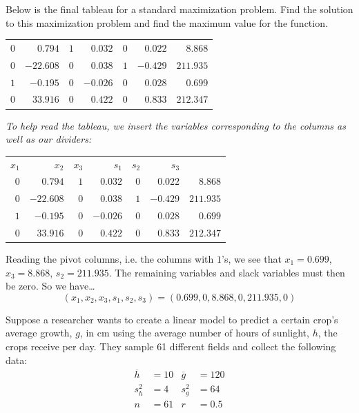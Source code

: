 \documentclass[12pt,letterpaper]{exam}
\begin{document}
\begin{questions}
\newpage
\question[10] Below is the final tableau for a standard maximization problem. Find the solution to this maximization problem and find the maximum value for the function.
	\begin{table}[!ht]
	\centering
	\begin{tabular}{rrrrrrr}
	$0$ & $0.794$ & $1$ & $0.032$ & $0$ & $0.022$ & $8.868$ \\
	$0$ & $-22.608$ & $0$ & $0.038$ & $1$ & $-0.429$ & $211.935$ \\
	$1$ & $-0.195$ & $0$ & $-0.026$ & $0$ & $0.028$ & $0.699$ \\
	$0$ & $33.916$ & $0$ & $0.422$ & $0$ & $0.833$ & $212.347$
	\end{tabular}
	\end{table}

{\itshape To help read the tableau, we insert the variables corresponding to the columns as well as our dividers: \par
	\begin{table}[!ht]
	\centering
	\begin{tabular}{rrrrrrr}
	{\scriptsize$x_1$} & {\scriptsize$x_2$} & {\scriptsize$x_3$} & {\scriptsize$s_1$} & {\scriptsize$s_2$} & {\scriptsize$s_3$} & \\
	$0$ & $0.794$ & $1$ & $0.032$ & $0$ & \multicolumn{1}{r|}{$0.022$} & $8.868$ \\
	$0$ & $-22.608$ & $0$ & $0.038$ & $1$ & \multicolumn{1}{r|}{$-0.429$} & $211.935$ \\
	$1$ & $-0.195$ & $0$ & $-0.026$ & $0$ & \multicolumn{1}{r|}{$0.028$} & $0.699$ \\ \hline
	$0$ & $33.916$ & $0$ & $0.422$ & $0$ & \multicolumn{1}{r|}{$0.833$} & $212.347$ 
	\end{tabular}
	\end{table} \par
Reading the pivot columns, i.e. the columns with $1$'s, we see that $x_1= 0.699$, $x_3= 8.868$, $s_2= 211.935$. The remaining variables and slack variables must then be zero. So we have\dots
	\[
	(x_1, x_2, x_3, s_1, s_2, s_3)= (0.699, 0, 8.868, 0, 211.935, 0)
	\]
}





\newpage
\question[10] Suppose a researcher wants to create a linear model to predict a certain crop's average growth, $g$, in cm using the average number of hours of sunlight, $h$, the crops receive per day. They sample 61 different fields and collect the following data:
	\[
	\begin{aligned}
	\overline{h}&= 10 & \overline{g}&= 120 \\
	s_h^2&= 4 & s_g^2&= 64 \\
	n&= 61 & r&= 0.5
	\end{aligned}
	\] \pspace


\end{questions}
\end{document}

